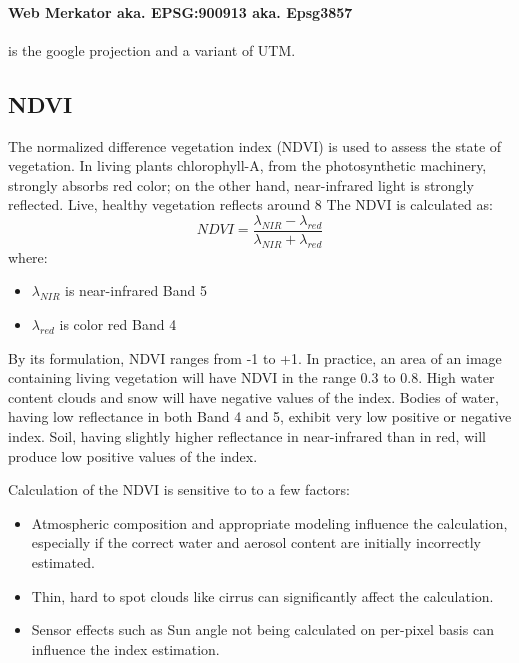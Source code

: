 \paragraph{Web Merkator aka. EPSG:900913 aka. Epsg3857} is the google projection and a variant of UTM.






\subsection{NDVI}
The normalized difference vegetation index (NDVI) is used to assess the state of vegetation. In living plants chlorophyll-A, from the photosynthetic machinery, strongly absorbs red color; on the other hand, near-infrared light is strongly reflected. Live, healthy vegetation reflects around 8%
The NDVI is calculated as:
$$ NDVI = \frac{\lambda_{NIR} - \lambda_{red}}{\lambda_{NIR} + \lambda_{red}} $$
where:
\begin{itemize}
    \item $\lambda_{NIR}$ is near-infrared Band 5
    \item $\lambda_{red}$ is color red Band 4
\end{itemize}
By its formulation, NDVI ranges from -1 to +1. In practice, an area of an image containing living vegetation will have NDVI in the range 0.3 to 0.8. High water content clouds and snow will have negative values of the index. Bodies of water, having low reflectance in both Band 4 and 5, exhibit very low positive or negative index. Soil, having slightly higher reflectance in near-infrared than in red, will produce low positive values of the index.

Calculation of the NDVI is sensitive to to a few factors:
\begin{itemize}
    \item Atmospheric composition and appropriate modeling influence the calculation, especially if the correct water and aerosol content are initially incorrectly estimated.
    \item Thin, hard to spot clouds like cirrus can significantly affect the calculation.
    \item Sensor effects such as Sun angle not being calculated on per-pixel basis can influence the index estimation.
\end{itemize}



